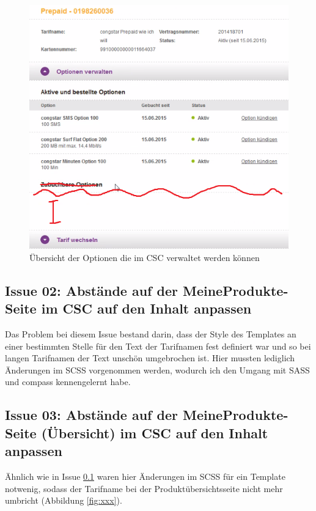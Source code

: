 \documentclass[11pt,a4paper]{article}
\begin{document}
\begin{figure}[h] 
\includegraphics[width=\textwidth]{images/optionenzubuchun.png}
\caption{Übersicht der Optionen die im CSC verwaltet werden können \cite{congstarv}}
\label{fig:optZuBuch}
\centering 
\end{figure}


\subsection{Issue 02: Abstände auf der MeineProdukte-Seite im CSC auf den Inhalt anpassen} \label{sec:issue02}

Das Problem bei diesem Issue bestand darin, dass der Style des Templates an einer bestimmten Stelle für den Text
der Tarifnamen fest definiert war und so bei langen Tarifnamen der Text unschön umgebrochen ist.
Hier mussten lediglich Änderungen im SCSS vorgenommen werden, wodurch ich den Umgang mit SASS und compass
kennengelernt habe.


\subsection{Issue 03: Abstände auf der MeineProdukte-Seite (Übersicht) im CSC auf den Inhalt anpassen} 

Ähnlich wie in Issue \ref{sec:issue02} waren hier Änderungen im SCSS für ein Template notwenig, sodass
der Tarifname bei der Produktübersichtsseite nicht mehr umbricht (Abbildung \ref{fig:xxx}).
\end{document}
